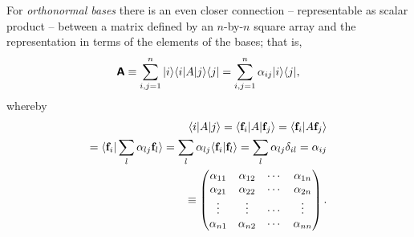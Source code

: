 For {\em orthonormal bases}
there is an even closer connection -- representable as scalar product -- between a matrix
defined by an $n$-by-$n$ square array and the representation in terms of the elements of the bases; that is,
\begin{equation}
\begin{split}
\textsf{\textbf{A}}  \equiv
\sum_{i,j=1}^n
\vert i\rangle \langle i\vert A\vert j\rangle \langle j\vert  =
\sum_{i,j=1}^n \alpha_{ij}
\vert i\rangle  \langle j\vert,
\end{split}
\end{equation}
whereby
\begin{equation}
\begin{split}
\langle i\vert A\vert j\rangle =
 \langle {\bf f}_i \vert A \vert {\bf f}_j\rangle
= \langle {\bf f}_i \vert A   {\bf f}_j\rangle \\
= \langle {\bf f}_i \vert \sum_l \alpha_{lj}{\bf f}_l \rangle
=  \sum_l \alpha_{lj} \langle {\bf f}_i \vert {\bf f}_l \rangle
=  \sum_l \alpha_{lj} \delta_{il}  = \alpha_{ij} \\
\equiv
\begin{pmatrix}
\alpha_{11}&
\alpha_{12}&
\cdots    &
\alpha_{1n}\\
\alpha_{21}&
\alpha_{22}&
\cdots    &
\alpha_{2n}\\
\vdots&
\vdots&
\cdots    &
\vdots\\
\alpha_{n1}&
\alpha_{n2}&
\cdots   &
\alpha_{nn}
\end{pmatrix}
.
\end{split}
\end{equation}





